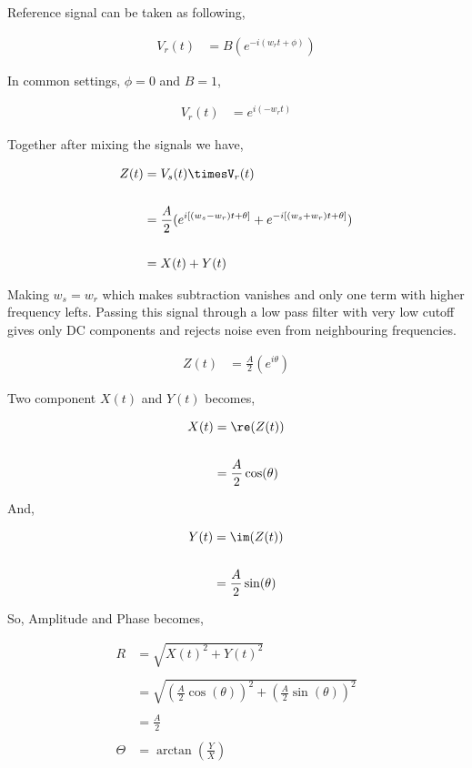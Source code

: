 \documentclass[draft,12pt]{article}
\begin{document}
Reference signal can be taken as following,

\begin{align*}
V_r(t) & = B (e^{-i(w_rt+\phi)})
\end{align*}

In common settings, $\phi = 0$ and $B=1$,

\begin{align*}
V_r(t) & = e^{i(-w_rt)}
\end{align*}

Together after mixing the signals we have,

\begin{align*}
Z(t) & = V_s(t)\timesV_r(t)\\
\\
& = \frac{A}{2}(e^{i\left[ (w_s-w_r)t+\theta \right]}+e^{-i\left[ (w_s+w_r)t+\theta \right]})\\
\\
& = X(t)+Y(t)
\end{align*}

Making $w_s=w_r$ which makes subtraction vanishes and only one term with higher frequency lefts. Passing this signal through a low pass filter with very low cutoff gives only DC components and rejects noise even from neighbouring frequencies.


\begin{align*}
Z(t) & = \frac{A}{2}(e^{i \theta})
\end{align*}

Two component $X(t)$ and $Y(t)$ becomes,

\begin{align*}
X(t) & =\re(Z(t))\\
\\
& =  \frac{A}{2}\cos(\theta)
\end{align*}

And,

\begin{align*}
Y(t) & = \im(Z(t))\\
\\
& =  \frac{A}{2}\sin(\theta)
\end{align*}

So, Amplitude and Phase becomes, 

\begin{align*}
R & = \sqrt{X(t)^2+Y(t)^2}\\
\\
& =  \sqrt{(\frac{A}{2}\cos(\theta))^2+(\frac{A}{2}\sin(\theta))^2}\\
\\
& = \frac{A}{2}\\
\\
\Theta & = \arctan(\frac{Y}{X})
\end{align*}
\end{document}
